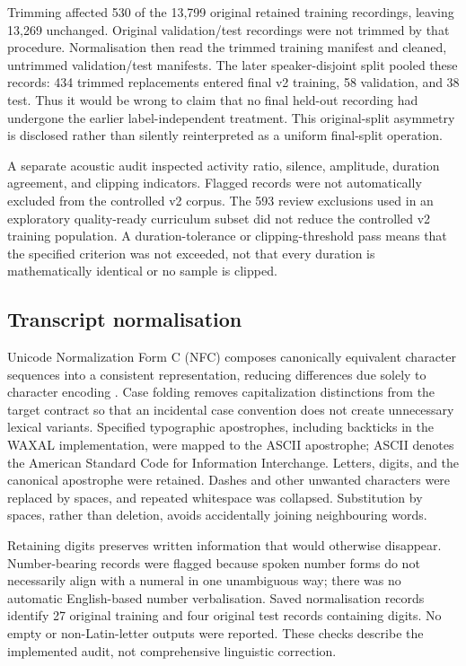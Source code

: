 \documentclass[12pt,a4paper]{report}
\begin{document}
Trimming affected 530 of the 13,799 original retained training recordings, leaving 13,269 unchanged. Original validation/test recordings were not trimmed by that procedure. Normalisation then read the trimmed training manifest and cleaned, untrimmed validation/test manifests. The later speaker-disjoint split pooled these records: 434 trimmed replacements entered final v2 training, 58 validation, and 38 test. Thus it would be wrong to claim that no final held-out recording had undergone the earlier label-independent treatment. This original-split asymmetry is disclosed rather than silently reinterpreted as a uniform final-split operation.

A separate acoustic audit inspected activity ratio, silence, amplitude, duration agreement, and clipping indicators. Flagged records were not automatically excluded from the controlled v2 corpus. The 593 review exclusions used in an exploratory quality-ready curriculum subset did not reduce the controlled v2 training population. A duration-tolerance or clipping-threshold pass means that the specified criterion was not exceeded, not that every duration is mathematically identical or no sample is clipped.

\subsection{Transcript normalisation}

Unicode Normalization Form C (NFC) composes canonically equivalent character sequences into a consistent representation, reducing differences due solely to character encoding \citep{UnicodeNFC}. Case folding removes capitalization distinctions from the target contract so that an incidental case convention does not create unnecessary lexical variants. Specified typographic apostrophes, including backticks in the WAXAL implementation, were mapped to the ASCII apostrophe; ASCII denotes the American Standard Code for Information Interchange. Letters, digits, and the canonical apostrophe were retained. Dashes and other unwanted characters were replaced by spaces, and repeated whitespace was collapsed. Substitution by spaces, rather than deletion, avoids accidentally joining neighbouring words.

Retaining digits preserves written information that would otherwise disappear. Number-bearing records were flagged because spoken number forms do not necessarily align with a numeral in one unambiguous way; there was no automatic English-based number verbalisation. Saved normalisation records identify 27 original training and four original test records containing digits. No empty or non-Latin-letter outputs were reported. These checks describe the implemented audit, not comprehensive linguistic correction.
\end{document}

